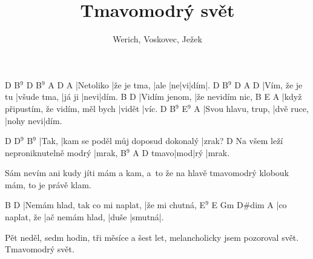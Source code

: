 \documentclass{song}
\title{Tmavomodrý svět}
\author{Werich, Voskovec, Ježek}
\newcommand{\9}{$^9$}
\begin{document}
\strophe
D         B\9         D   B\9 A\7 D  A\7
|Netoliko |že je tma, |ale |ne|vi|dím|.
D              B\9         D      A\7  D
|Vím, že je tu |všude tma, |já ji |nevi|dím.
B             D
|Vidím jenom, |že nevidím nic,
B                                   E\7    A\7
|když připustím, že vidím, měl bych |vidět |víc.
D                  B\9        E\9       A\7
|Svou hlavu, trup, |dvě ruce, |nohy nevi|dím.
\endstrophe

D     D\9                                B\9
|Tak, |kam se poděl můj doposud dokonalý |zrak?
                                   D
Na všem leží neproniknutelně modrý |mrak,
     B\9 A\7 D
tmavo|mod|rý |mrak.
\endstrophe

Sám nevím ani kudy jíti mám a kam,
a~to že na hlavě tmavomodrý klobouk mám,
to je právě klam.
\endstrophe

\strophe
B                              D
|Nemám hlad, tak co mi naplat, |že mi chutná,
E\9            E\7             Gm\6 D\#dim A\7
|co naplat, že |ač nemám hlad, |duše |smutná|.
\endstrophe

Pět neděl, sedm hodin, tři měsíce a šest let,
melancholicky jsem pozoroval svět.
Tmavomodrý svět.
\endstrophe

\end{document}
